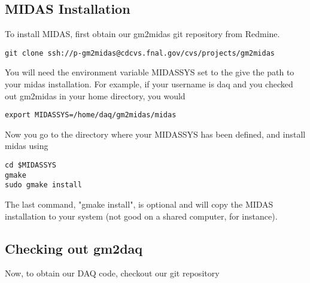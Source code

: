 \subsection{MIDAS Installation}

To install MIDAS, first obtain our gm2midas git repository from Redmine.

\begin{verbatim}
git clone ssh://p-gm2midas@cdcvs.fnal.gov/cvs/projects/gm2midas
\end{verbatim}

You will need the environment variable MIDASSYS set to the give the path to your midas installation. For example, if your username is daq and you checked out gm2midas in your home directory, you would

\begin{verbatim}
export MIDASSYS=/home/daq/gm2midas/midas
\end{verbatim}

Now you go to the directory where your MIDASSYS has been defined, and install midas using

\begin{verbatim}
cd $MIDASSYS
gmake
sudo gmake install
\end{verbatim}

The last command, "gmake install", is optional and will copy the MIDAS installation to your system (not good on a shared computer, for instance). 




\subsection{Checking out gm2daq}

Now, to obtain our DAQ code, checkout our git repository


